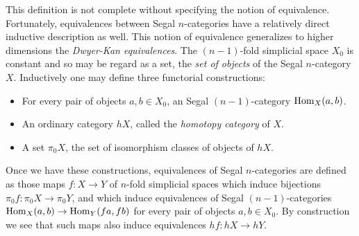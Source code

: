 \documentclass{amsart}
\begin{document}
\noindent This definition is not complete without specifying the notion of equivalence. Fortunately, equivalences between Segal $n$-categories have a relatively direct inductive description as well. This notion of equivalence generalizes to higher dimensions the {\em Dwyer-Kan equivalences}. The $(n-1)$-fold simplicial space $X_0$ is constant and so may be regard as a set, the {\em set of objects} of the Segal $n$-category $X$. 
Inductively one may define three functorial constructions:
\begin{itemize}
	\item For every pair of objects $a,b \in X_0$, an Segal $(n-1)$-category $\operatorname{Hom}_X(a,b)$.
	\item An ordinary category $\mathit{h}X$, called the {\em homotopy category} of $X$.
	\item A set $\pi_0 X$, the set of isomorphism classes of objects of $\mathit{h}X$. 
\end{itemize}
Once we have these constructions, equivalences of Segal $n$-categories are defined as those maps $f:X \to Y$ of $n$-fold simplicial spaces which induce bijections $\pi_0 f: \pi_0 X \to \pi_0 Y$, 
and which induce equivalences of Segal $(n-1)$-categories $\operatorname{Hom}_X(a,b) \to \operatorname{Hom}_Y(fa, fb)$ for every pair of objects $a,b \in X_0$. By construction we see that such maps also induce equivalences $\mathit{h}f:\mathit{h}X \to \mathit{h}Y$.
\end{document}
